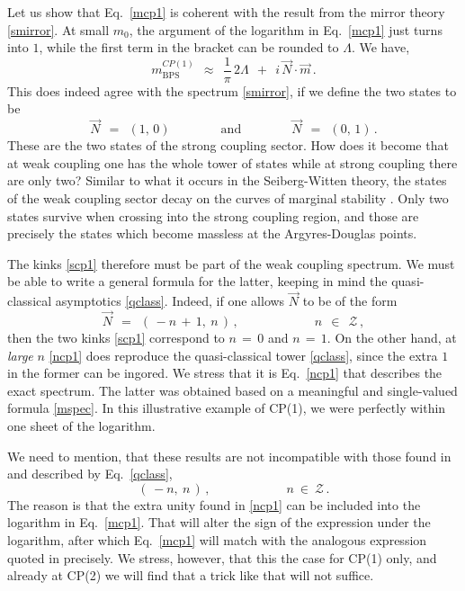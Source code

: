 \documentclass[epsfig,12pt]{article}
\def\beq{\begin{equation}}
\def\eeq{\end{equation}}
\def\beq{\begin{equation}}
\def\eeq{\end{equation}}
\newcommand{\mc}[1]{\mathcal{#1}}
\begin{document}
	Let us show that Eq.~\eqref{mcp1} is coherent with the result from the 
	mirror theory \eqref{smirror}.
	At small $ m_0 $, the argument of the logarithm in Eq.~\eqref{mcp1} just turns into $ 1 $, 
	while the first term in the bracket can be rounded to $ \Lambda $.
	We have,
\beq
	m_\text{BPS}^{CP(1)} ~~\approx~~ 
		\frac{1}{\pi}\, 2\Lambda  ~~+~~ i\, \vec{N} \cdot \vec{m}\,.
\eeq
	This does indeed agree with the spectrum \eqref{smirror}, if we define the two states to be
\beq
\label{scp1}
	\vec{N} ~~=~~ (1,\, 0)  \qquad\qquad\text{and}\qquad\qquad  \vec{N} ~~=~~ (0,\, 1)\,.
\eeq
	These are the two states of the strong coupling sector. 
	How does it become that at weak coupling one has the whole tower of states
	while at strong coupling there are only two?
	Similar to what it occurs in the Seiberg-Witten theory, the states of the weak coupling sector
	decay on the curves of marginal stability \cite{Bilal:1996sk,Bilal:1997st}.
	Only two states survive when crossing into the strong coupling region, 
	and those are precisely the states which become massless at the Argyres-Douglas points.

	The kinks \eqref{scp1} therefore must be part of the weak coupling spectrum.
	We must be able to write a general formula for the latter, 
	keeping in mind the quasi-classical asymptotics \eqref{qclass}.
	Indeed, if one allows $ \vec{N} $ to be of the form
\beq
\label{ncp1}
	\vec{N} ~~=~~ (\, - n \,+\, 1,~ n \,)\,, \qquad\qquad\qquad n ~~\in~~ \mc{Z}\,,
\eeq
	then the two kinks \eqref{scp1} correspond to $ n \,=\, 0 $ and $ n \,=\, 1 $.
	On the other hand, at {\it large} $ n $ \eqref{ncp1} does reproduce the quasi-classical
	tower \eqref{qclass}, since the extra $ 1 $ in the former can be ingored.
	We stress that it is Eq.~\eqref{ncp1} that describes the exact spectrum.
	The latter was obtained based on a meaningful and single-valued formula \eqref{mspec}.
	In this illustrative example of CP(1), we were perfectly within one sheet of the logarithm. 

	We need to mention, that these results are not incompatible with those
	found in \cite{Dor} and described by Eq.~\eqref{qclass}, 
\beq
	(\, -n,~ n\,)\,, \qquad\qquad\qquad n ~\in~ \mc{Z}\,.
\eeq
	The reason is that the extra unity found in \eqref{ncp1} can be included into the logarithm in
	Eq.~\eqref{mcp1}.
	That will alter the sign of the expression under the logarithm, after which Eq.~\eqref{mcp1}
	will match with the analogous expression quoted in \cite{Dor} precisely.
	We stress, however, that this the case for CP(1) only, and already at CP(2) we will find that a
	trick like that will not suffice.
\end{document}
